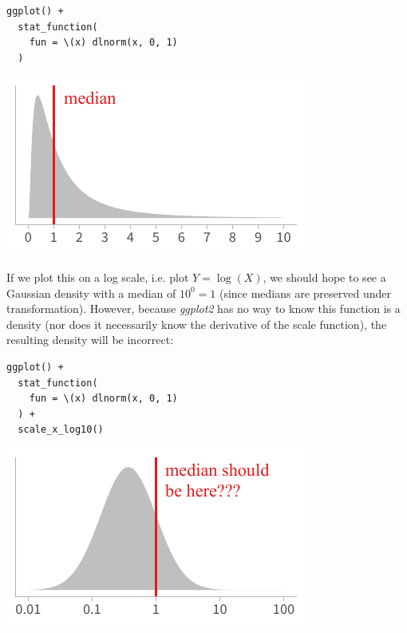 \documentclass[journal]{vgtc}                     %
\begin{document}
\noindent
\begin{minipage}{.5\columnwidth}
\small
\begin{verbatim}
ggplot() +
  stat_function(
    fun = \(x) dlnorm(x, 0, 1)
  )
\end{verbatim}
\end{minipage}%
  \begin{minipage}{.4\columnwidth}
    \centering
    \includegraphics[width=1.2\columnwidth]{figs/3-jacobian-lognorm.pdf}
  \end{minipage}
\hfill\break


If we plot this on a log scale, i.e. plot $Y = \log(X)$, we should hope to see a Gaussian density with a median of $10^0 = 1$ (since medians are preserved under transformation). However, because \textit{ggplot2} has no way to know this function is a density (nor does it necessarily know the derivative of the scale function), the resulting density will be incorrect:

\noindent
\begin{minipage}{.5\columnwidth}
\small
\begin{verbatim}
ggplot() +
  stat_function(
    fun = \(x) dlnorm(x, 0, 1)
  ) +
  scale_x_log10()
\end{verbatim}
\end{minipage}%
  \begin{minipage}{.4\columnwidth}
    \centering
    \includegraphics[width=1.2\columnwidth]{figs/3-jacobian-incorrect.pdf}
  \end{minipage}
\hfill\break
\end{document}
